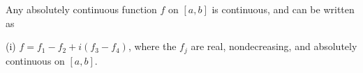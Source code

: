 Any absolutely continuous function $f$ on $[a, b]$ is continuous, and can be written as

(i) $f = f_1 - f_2 + i(f_3 - f_4)$, where the $f_j$ are real, nondecreasing, and absolutely continuous on $[a, b]$.